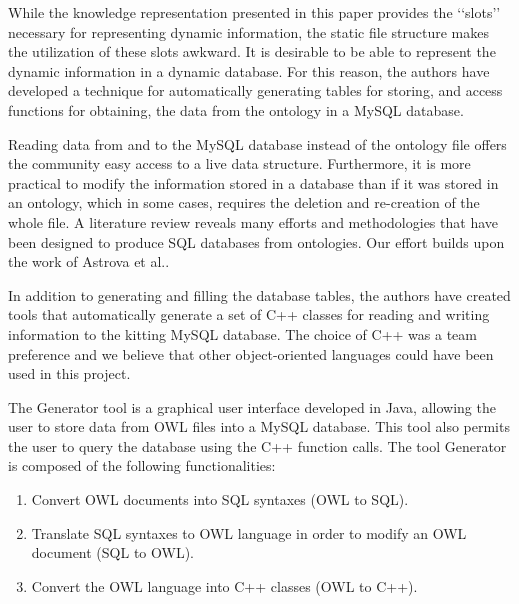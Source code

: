 While the knowledge representation presented in this paper provides the \lq\lq{}slots\rq\rq{} necessary for representing dynamic information, the
static file structure makes the utilization of these slots awkward. It is desirable to be able to represent the dynamic information in a dynamic database.
For this reason, the authors have developed a technique for automatically generating tables for storing,  and access functions
for obtaining, the data from the ontology in a MySQL database.

Reading data from and to the MySQL database instead of the ontology file offers the community easy access to a live data structure. Furthermore, it is more practical to modify the information stored in a database than if it was stored in an ontology, which in some cases, requires the deletion and re-creation of the whole file. A literature review reveals many efforts and methodologies that have been designed to produce SQL databases from ontologies. Our effort builds upon the work of Astrova et al.\cite{Astrova2007}. 

In addition to generating and filling the database tables, the authors have created tools that automatically generate a set of C++ classes for reading and writing
information to the kitting MySQL database. The choice of C++ was a team preference and we believe that other object-oriented languages could have been used in this project.

The Generator tool is a graphical user interface developed in Java, allowing the user to store data from OWL files into a MySQL database. This tool also permits the user to query the database using the C++ function calls. The tool Generator is composed of the following functionalities:
\begin{enumerate}
 \item Convert OWL documents into SQL syntaxes (OWL to SQL).
 \item Translate SQL syntaxes to OWL language in order to modify an OWL document (SQL to OWL).
 \item Convert the OWL language into C++ classes (OWL to C++).
\end{enumerate}

